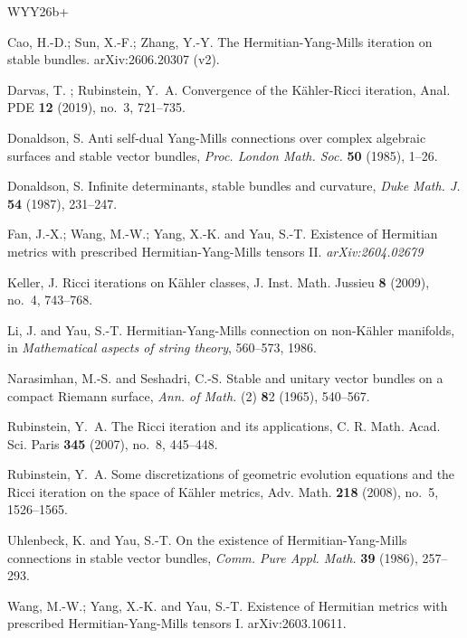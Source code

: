 \documentclass[12pt, reqno]{amsart}
\theoremstyle{plain}
\theoremstyle{definition}
\renewcommand{\>}{\rightarrow}
\numberwithin{equation}{section}
\begin{document}
\begin{thebibliography}{WYY26b+}
	
	Cao, H.-D.; Sun, X.-F.; Zhang, Y.-Y.
	The Hermitian-Yang-Mills iteration on stable bundles. arXiv:2606.20307 (v2).
	
	

	
		Darvas, T. ; Rubinstein,  Y.~A. Convergence of the K\"ahler-Ricci iteration, Anal. PDE {\bf 12} (2019), no.~3, 721--735.
	
	Donaldson, S. Anti self-dual Yang-Mills connections over complex algebraic surfaces and stable vector bundles,
	\emph{Proc. London Math. Soc.} \textbf{50} (1985), 1--26.
	
	Donaldson, S.  Infinite determinants, stable bundles and curvature,
	\emph{Duke Math. J.} \textbf{54} (1987), 231--247.
	
		 Fan, J.-X.; Wang, M.-W.; Yang, X.-K. and Yau, S.-T. Existence of Hermitian metrics  with  prescribed Hermitian-Yang-Mills tensors  II.  \emph{arXiv:2604.02679}
	
	
		Keller, J.  Ricci iterations on K\"ahler classes, J. Inst. Math. Jussieu {\bf 8} (2009), no.~4, 743--768.
	
	
	Li, J. and Yau, S.-T.  Hermitian-Yang-Mills connection on non-K\"ahler manifolds, in {\it Mathematical aspects of string theory},  560--573, 1986.
	
	Narasimhan, M.-S.  and  Seshadri, C.-S.  Stable and unitary vector bundles on a compact Riemann surface,  \emph{Ann. of Math.} (2) {\textbf 82} (1965), 540--567.
	
		 Rubinstein, Y.~A. The Ricci iteration and its applications, C. R. Math. Acad. Sci. Paris {\bf 345} (2007), no.~8, 445--448.
	
		 Rubinstein, Y.~A.  Some discretizations of geometric evolution equations and the Ricci iteration on the space of K\"ahler metrics, Adv. Math. {\bf 218} (2008), no.~5, 1526--1565.
	
	
	Uhlenbeck, K. and Yau, S.-T.
	On the existence of Hermitian-Yang-Mills connections in stable vector bundles,
	\emph{Comm. Pure Appl. Math.} \textbf{39} (1986), 257--293.
	
	Wang, M.-W.; Yang, X.-K. and Yau, S.-T.
	Existence of Hermitian metrics with prescribed Hermitian-Yang-Mills tensors I.
	arXiv:2603.10611.
	

\end{thebibliography}
\end{document}
